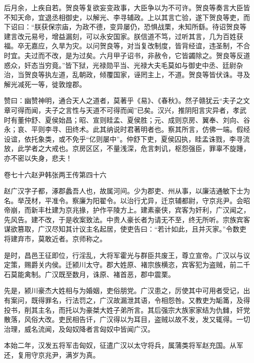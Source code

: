 \documentclass[12pt,UTF8]{ctexbook}
\begin{document}
后月余，上疾自若。贺良等复欲妄变政事，大臣争以为不可许。贺良等奏言大臣皆不知天命，宜退丞相御史，以解光、李寻辅政。上以其言亡验，遂下贺良等吏，而下诏曰：“朕获保宗庙，为政不德，变异屡仍，恐惧战栗，未知所繇。待诏贺良等建言改元易号，增益漏刻，可以永安国家。朕信道不笃，过听其言，几为百姓获福。卒无嘉应，久旱为灾。以问贺良等，对当复改制度，皆背经谊，违圣制，不合时宜。夫过而不改，是为过矣。六月甲子诏书，非赦令，它皆蠲除之。贺良等反道惑众，奸态当穷竟。”皆下狱，光禄勋平当、光禄大夫毛莫如与御史中丞、廷尉杂治，当贺良等执左道，乱朝政，倾覆国家，诬罔主上，不道。贺良等皆伏诛。寻及解光减死一等，徙敦煌郡。



赞曰：幽赞神明，通合天人之道者，莫著乎《易》、《春秋》。然子赣犹云“夫子之文章可得而闻，夫子之言性与天道不可得而闻”已矣。汉兴，推阴阳言灾异者，孝武时有董仲舒、夏侯始昌；昭、宣则眭孟、夏侯胜；元、成则京房、翼奉、刘向、谷永；哀、平则李寻、田终术。此其纳说时君著明者也。察其所言，仿佛一端。假经设谊，依托象类，或不免乎“亿则屡中”。仲舒下吏，夏侯囚执，眭孟诛戮，李寻流放，此学者之大戒也。京房区区，不量浅深，危言刺讥，枢怨强臣，罪辜不旋踵，亦不密以失身，悲夫！





卷七十六赵尹韩张两王传第四十六



赵广汉字子都，涿郡蠡吾人也，故属河间。少为郡吏、州从事，以廉洁通敏下士为名。举茂材，平准令。察廉为阳翟令。以治行尤异，迁京辅都尉，守京兆尹。会昭帝崩，而新丰杜建为京兆掾，护作平陵方上。建素豪侠，宾客为奸利，广汉闻之，先风告。建不改，于是收案致法。中贵人豪长者为请无不至，终无所听。宗族宾客谋欲篡取，广汉尽知其计议主名起居，使吏告曰：“若计如此，且并灭家。”令数吏将建弃市，莫敢近者。京师称之。



是时，昌邑王征即位，行淫乱，大将军霍光与群臣共废王，尊立宣帝。广汉以与议定策，赐爵关内侯。迁颍川太守。郡大姓原、褚宗族横恣，宾客犯为盗贼，前二千石莫能禽制。广汉既至数月，诛原、褚首恶，郡中震栗。



先是，颍川豪杰大姓相与为婚姻，吏俗朋党。广汉患之，厉使其中可用者受记，出有案问，既得罪名，行法罚之，广汉故漏泄其语，令相怨咎。又教吏为缿筩，及得投书，削其主名，而托以为豪桀大姓子弟所言。其后强宗大族家家结为仇雠，奸党散落，风俗大改。吏民相告讦，广汉得以为耳目，盗贼以故不发，发又辄得。一切治理，威名流闻，及匈奴降者言匈奴中皆闻广汉。



本始二年，汉发五将军击匈奴，征遣广汉以太守将兵，属蒲类将军赵充国。从军还，复用守京兆尹，满岁为真。
\end{document}
